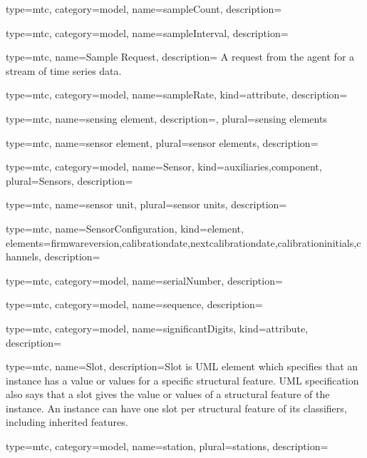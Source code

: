 {
  type=mtc,
  category=model,
  name={sampleCount},
  description={}
}


{
  type=mtc,
  category=model,
  name={sampleInterval},
  description={}
}


{
  type=mtc,
  name={Sample Request},
  description= {A request from the \gls{agent} for a stream of time series data.}
}


{
  type=mtc,
  category=model,
  name={sampleRate},
  kind={attribute},
  description={}
}


{
  type=mtc,
  name={sensing element},
  description={},
  plural={sensing elements}
}


{
  type=mtc,
  name={sensor element},
  plural={sensor elements},
  description={}
}


{
  type=mtc,
  category=model,
  name={Sensor},
  kind={auxiliaries,component},
  plural={Sensors},
  description= {}
}


{
  type=mtc,
  name={sensor unit},
  plural={sensor units},
  description= {}
}


{
  type=mtc,
  name={SensorConfiguration},
  kind={element},
  elements={\gls{firmwareversion},\gls{calibrationdate},\gls{nextcalibrationdate},\gls{calibrationinitials},\glspl{channel}},
  description= {}
}


{
  type=mtc,
  category=model,
  name={serialNumber},
  description={}
}


{
  type=mtc,
  category=model,
  name={sequence},
  description={}
}


{
  type=mtc,
  category=model,
  name={significantDigits},
  kind={attribute},
  description={}
}


{
  type=mtc,
  name=Slot,
  description={Slot is UML element which specifies that an instance has a value or values for a specific structural feature. UML specification also says that a slot gives the value or values of a structural feature of the instance. An instance can have one slot per structural feature of its classifiers, including inherited features.}
}


{
  type=mtc,
  category=model,
  name={station},
  plural={stations},
  description={}
}


